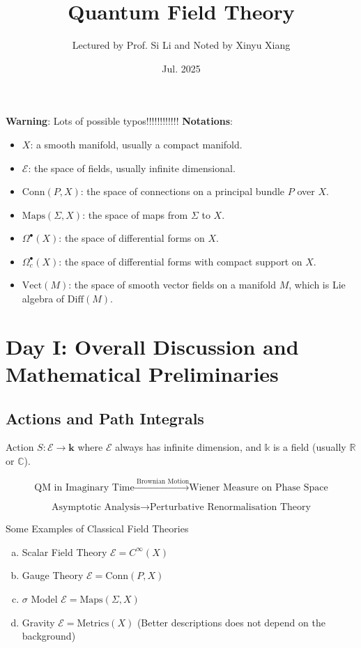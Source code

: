\documentclass[10pt]{article}
\title{\textbf{Quantum Field Theory}}
\author{Lectured by Prof. Si Li and Noted by Xinyu Xiang}
\date{Jul. 2025}
\begin{document}
\maketitle

\textbf{Warning}: Lots of possible typos!!!!!!!!!!!!
\textbf{Notations}:
\begin{itemize}
  \item $ X$: a smooth manifold, usually a compact manifold.
  \item $ \mathcal{E}$: the space of fields, usually infinite dimensional.
  \item $ \mathrm{Conn}(P,X)$: the space of connections on a principal bundle $ P$ over $ X$.
  \item $ \text{Maps}(\Sigma, X)$: the space of maps from $\Sigma$ to $ X$.
  \item $ \Omega^{\bullet}(X)$: the space of differential forms on $ X$.
  \item $ \Omega^{\bullet}_{c}(X)$: the space of differential forms with compact support on $ X$.
  \item $ \mathrm{Vect}(M)$: the space of smooth vector fields on a manifold $ M$, which is Lie algebra of $ \mathrm{Diff}(M)$.
\end{itemize}

\section{Day I: Overall Discussion and Mathematical Preliminaries}

\subsection{Actions and Path Integrals}

Action $ S: \mathcal{E} \rightarrow \mathbf{k}$ where $ \mathcal{E}$ always has infinite dimension, and $ \mathbb{k}$ is a field (usually $ \mathbb{R}$ or $ \mathbb{C}$).

\begin{equation*}
  \text{QM in Imaginary Time} \xrightarrow{\text{ Brownian Motion}} \text{Wiener Measure on Phase Space}
\end{equation*}

\begin{equation*}
  \text{Asymptotic Analysis} \xrightarrow{\quad} \text{Perturbative Renormalisation Theory}
\end{equation*}

\begin{example} Some Examples of Classical Field Theories
  \begin{enumerate}[(a)]
    \item Scalar Field Theory $ \mathcal{E} = C^{\infty }(X)$
    \item Gauge Theory $ \mathcal{E} = \mathrm{Conn}(P,X)$
    \item $ \sigma$ Model $ \mathcal{E} = \text{Maps}(\Sigma, X)$
    \item Gravity $ \mathcal{E} = \text{Metrics}(X)$ (Better descriptions does not depend on the background)
  \end{enumerate}
\end{example}
\end{document}

